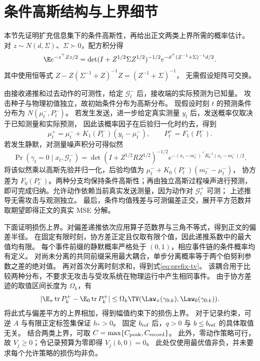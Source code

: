 \section{条件高斯结构与上界细节}
\label{app:conditional}
本节先证明扩充信息集下的条件高斯性，再给出正文两类上界所需的概率估计。
对 $z\sim N(d,\Sigma)$、$\Sigma\succ0$，配方积分得
\begin{equation}
 \E e^{-z^\top Zz/2}=\det(I+Z^{1/2}\Sigma Z^{1/2})^{-1/2}
 e^{-d^\top(Z^{-1}+\Sigma)^{-1}d/2}.
 \label{eq:gaussian-integral}
\end{equation}
其中使用恒等式 $Z-Z(\Sigma^{-1}+Z)^{-1}Z=(Z^{-1}+\Sigma)^{-1}$，
无需假设矩阵可交换。

由接收递推和过去动作的可测性，给定 $\mathcal G_t^-$ 后，接收端的实际预测为已知量。
攻击种子与物理初值独立，故初始条件分布为高斯分布。
现假设时刻 $t$ 的预测条件分布为 $N(\mu_t^-,P_t^-)$。
若发生发送，进一步给定真实测量 $y_t$ 后，发送概率仅取决于已知测量和实际预测，
因此该概率因子在后验归一化时约去，得到
\begin{equation}
 \mu_t^+=\mu_t^-+K_1(P_t^-)(y_t-\mu_t^-),\qquad P_t^+=F_1(P_t^-).
\end{equation}
若发生静默，对测量噪声积分可得似然
\begin{equation}
 \Pr(\gamma_t=0\mid x_t,\mathcal G_t^-)
 =\det(I+Z^{1/2}RZ^{1/2})^{-1/2}
 e^{-(x_t-m_t^-)^\top R_0^{-1}(x_t-m_t^-)/2}.
\end{equation}
将该似然乘以高斯先验并归一化，后验均值为 $\mu_t^-+K_0(P_t^-)(m_t^--\mu_t^-)$，
协方差为 $F_0(P_t^-)$。两种分支均保持条件高斯性；再由独立高斯过程噪声进行预测，
即可完成归纳。允许动作依赖当前真实发送测量，因为动作对 $\mathcal G_t^+$ 可测；
上述推导无需攻击与观测独立。
最后，条件均值残差与可测偏差正交，展开平方范数并取期望即得正文的真实 MSE 分解。

下面证明损伤上界。对偏差递推依次应用算子范数界与三角不等式，得到正文的偏差半径。
在固定有限时刻，协方差正定且仅取有限个值，因此递推系数中的最大值均有限。
每个事件前缀的静默概率严格处于 $(0,1)$，相应事件链的条件概率均有定义。
对尚未分离的共同前缀采用最大耦合，单步分离概率等于两个伯努利参数之差的绝对值。
再对首次分离时刻求和，得到式\eqref{eq:prefix-tv}。
该耦合用于比较两种分布，不要求无攻击与受攻系统在物理运行中产生相同事件。
由于协方差迹的取值区间长度为 $\Omega_k$，有
\begin{equation}
 |\E_\pi\operatorname{tr}P_k^+-\E_0\operatorname{tr}P_k^+|
 \le\Omega_k\TV(\Law_\pi(\gamma_{0:k}),\Law_0(\gamma_{0:k})).
\end{equation}
将此式与偏差平方的上界相加，得到幅值约束下的损伤上界。
对于记录约束，可逆 $A$ 与有限正定标签集保证 $h_*>0$。
固定 $b_{\rm ref}$ 后，$q>0$ 与 $b\le b_{\rm ref}$ 的具体取值无关。
结合两类上界，可取 $C=\max\{C_{\rm peak},C_{\rm record}\}$。
此外，零动作策略可行，故 $V_j\ge0$；令记录预算为零即得 $V_j(b,0)=0$。
此处仅使用最优值非负，并未要求每个允许策略的损伤均非负。

